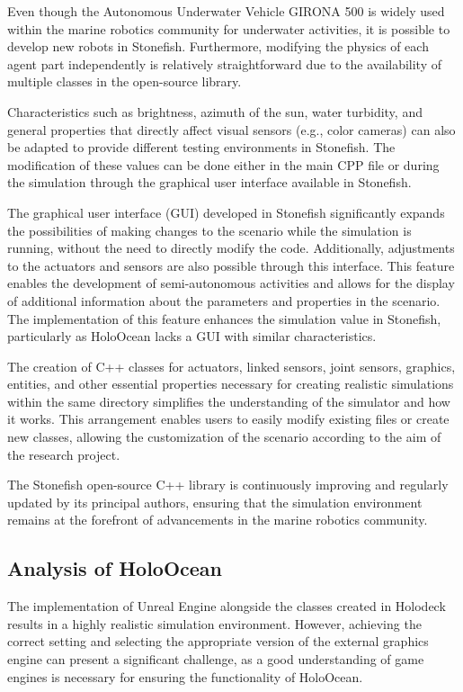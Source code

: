\documentclass[]{article}
\begin{document}
	Even though the Autonomous Underwater Vehicle GIRONA 500 is widely used within the marine robotics community for underwater activities, it is possible to develop new robots in Stonefish. Furthermore, modifying the physics of each agent part independently is relatively straightforward due to the availability of multiple classes in the open-source library.

	Characteristics such as brightness, azimuth of the sun, water turbidity, and general properties that directly affect visual sensors (e.g., color cameras) can also be adapted to provide different testing environments in Stonefish. The modification of these values can be done either in the main CPP file or during the simulation through the graphical user interface available in Stonefish.
	
	The graphical user interface (GUI) developed in Stonefish significantly expands the possibilities of making changes to the scenario while the simulation is running, without the need to directly modify the code. Additionally, adjustments to the actuators and sensors are also possible through this interface. This feature enables the development of semi-autonomous activities and allows for the display of additional information about the parameters and properties in the scenario. The implementation of this feature enhances the simulation value in Stonefish, particularly as HoloOcean lacks a GUI with similar characteristics.
	
	The creation of C++ classes for actuators, linked sensors, joint sensors, graphics, entities, and other essential properties necessary for creating realistic simulations within the same directory simplifies the understanding of the simulator and how it works. This arrangement enables users to easily modify existing files or create new classes, allowing the customization of the scenario according to the aim of the research project.
	
	The Stonefish open-source C++ library is continuously improving and regularly updated by its principal authors, ensuring that the simulation environment remains at the forefront of advancements in the marine robotics community.
	
	\subsection{Analysis of HoloOcean}
	
	The implementation of Unreal Engine alongside the classes created in Holodeck results in a highly realistic simulation environment. However, achieving the correct setting and selecting the appropriate version of the external graphics engine can present a significant challenge, as a good understanding of game engines is necessary for ensuring the functionality of HoloOcean.
	
\end{document}
